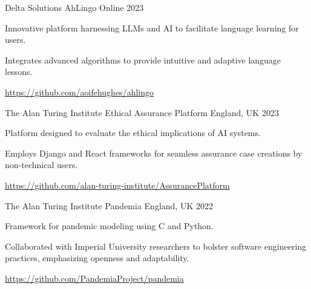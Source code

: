 
\begin{cventries}

  \cventry
    {Delta Solutions} %
    {AhLingo} %
    {Online} %
    {2023} %
    {
      \begin{cvitems}
        \item {Innovative platform harnessing LLMs and AI to facilitate language learning for users.}
        \item {Integrates advanced algorithms to provide intuitive and adaptive language lessons.}
        \item {\url{https://github.com/aoifehughes/ahlingo}}
      \end{cvitems}
    }

  \cventry
    {The Alan Turing Institute} %
    {Ethical Assurance Platform} %
    {England, UK} %
    {2023} %
    {
      \begin{cvitems}
        \item {Platform designed to evaluate the ethical implications of AI systems.}
        \item {Employs Django and React frameworks for seamless assurance case creations by non-technical users.}
        \item {\url{https://github.com/alan-turing-institute/AssurancePlatform}}
      \end{cvitems}
    }

  \cventry
    {The Alan Turing Institute} %
    {Pandemia} %
    {England, UK} %
    {2022} %
    {
      \begin{cvitems}
        \item {Framework for pandemic modeling using C and Python.}
        \item {Collaborated with Imperial University researchers to bolster software engineering practices, emphasizing openness and adaptability.}
        \item {\url{https://github.com/PandemiaProject/pandemia}}
      \end{cvitems}
    }


\end{cventries}
